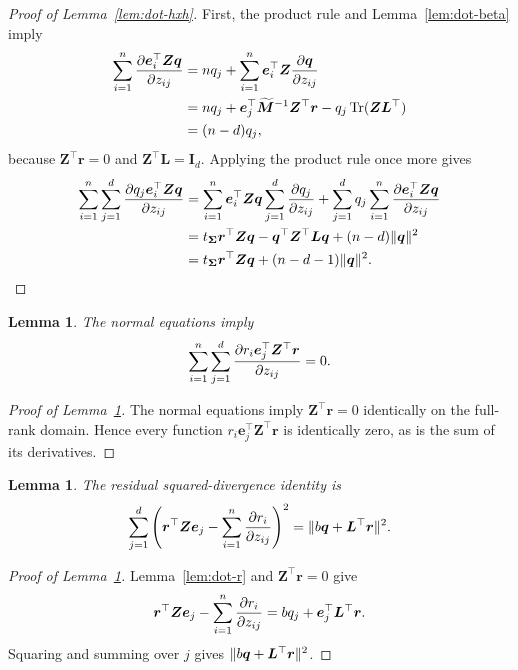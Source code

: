 \documentclass{article}
\theoremstyle{plain}
\newtheorem{lemma}[theorem]{Lemma}
\theoremstyle{definition}
\theoremstyle{definition}
\DeclarePairedDelimiter\norm{\lVert}{\rVert}
\DeclareMathOperator{\trace}{Tr}
\def\mathbold{\boldsymbol}
\def\bI{\mathbold{I}}\def\hbI{{\widehat{\bI}}}\def\tbI{{\widetilde{\bI}}}
\def\bL{\mathbold{L}}\def\hbL{{\widehat{\bL}}}\def\tbL{{\widetilde{\bL}}}
\def\bM{\mathbold{M}}\def\hbM{{\widehat{\bM}}}\def\tbM{{\widetilde{\bM}}}
\def\bq{\mathbold{q}}\def\qhat{\widehat{q}}\def\qtil{\widetilde{q}}\def\qbar{{\overline q}}
\def\br{\mathbold{r}}\def\rhat{\widehat{r}}\def\rtil{\widetilde{r}}\def\rbar{{\overline r}}
\def\be{\mathbold{e}}
\def\bZ{\mathbold{Z}}\def\hbZ{{\widehat{\bZ}}}\def\tbZ{{\widetilde{\bZ}}}
\def\bSigma{\mathbold{\Sigma}}\def\hbSigma{{\widehat{\bSigma}}}
\begin{document}
\begin{proof}[Proof of Lemma~\ref{lem:dot-hxh}]
First, the product rule and Lemma~\ref{lem:dot-beta} imply
\begin{align*}
    \sum_{i=1}^n\pdv{\be_i^\top\bZ\bq}{z_{ij}}
    &=nq_j+\sum_{i=1}^n\be_i^\top\bZ\pdv{\bq}{z_{ij}}\\
    &=nq_j+\be_j^\top\widetilde{\bM}^{-1}\bZ^\top\br
       -q_j\trace(\bZ\bL^\top)\\
    &=(n-d)q_j,
\end{align*}
because $\bZ^\top\br=0$ and $\bZ^\top\bL=\bI_d$.
Applying the product rule once more gives
\begin{align*}
    \sum_{i=1}^n\sum_{j=1}^d
       \pdv{q_j\be_i^\top\bZ\bq}{z_{ij}}
    &=\sum_{i=1}^n\be_i^\top\bZ\bq
       \sum_{j=1}^d\pdv{q_j}{z_{ij}}
       +\sum_{j=1}^d q_j
          \sum_{i=1}^n\pdv{\be_i^\top\bZ\bq}{z_{ij}}\\
    &=t_{\bSigma}\br^\top\bZ\bq
       -\bq^\top\bZ^\top\bL\bq+(n-d)\norm{\bq}^2\\
    &=t_{\bSigma}\br^\top\bZ\bq+(n-d-1)\norm{\bq}^2.
\end{align*}
\end{proof}

\begin{lemma}\label{lem:dot-rxr}
The normal equations imply
\begin{align*}
    \sum_{i=1}^n\sum_{j=1}^d
       \pdv{r_i\be_j^\top\bZ^\top\br}{z_{ij}}=0.
\end{align*}
\end{lemma}

\begin{proof}[Proof of Lemma~\ref{lem:dot-rxr}]
The normal equations imply $\bZ^\top\br=0$ identically on the full-rank
domain.  Hence every function $r_i\be_j^\top\bZ^\top\br$ is identically
zero, as is the sum of its derivatives.
\end{proof}

\begin{lemma}\label{lem:dot-rxxr}
The residual squared-divergence identity is
\begin{align*}
    \sum_{j=1}^d\left(
       \br^\top\bZ\be_j-\sum_{i=1}^n\pdv{r_i}{z_{ij}}
    \right)^2
    =\norm{b\bq+\bL^\top\br}^2.
\end{align*}
\end{lemma}

\begin{proof}[Proof of Lemma~\ref{lem:dot-rxxr}]
Lemma~\ref{lem:dot-r} and $\bZ^\top\br=0$ give
\begin{align*}
    \br^\top\bZ\be_j-\sum_{i=1}^n\pdv{r_i}{z_{ij}}
    =bq_j+\be_j^\top\bL^\top\br.
\end{align*}
Squaring and summing over $j$ gives $\norm{b\bq+\bL^\top\br}^2$.
\end{proof}
\end{document}
